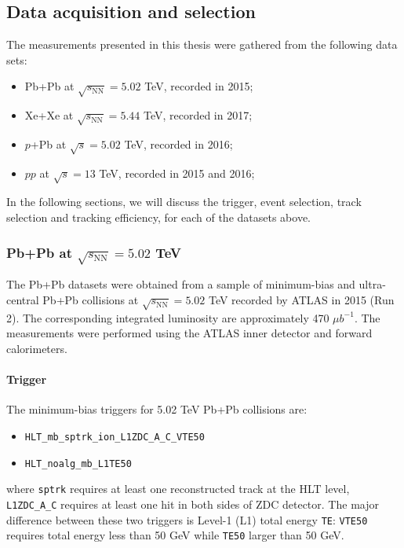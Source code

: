 \subsection{Data acquisition and selection}

The measurements presented in this thesis were gathered from the following data sets:
\begin{itemize}
\item Pb+Pb at $\sqrt{s_\text{NN}}=5.02$ TeV, recorded in 2015;
\item Xe+Xe at $\sqrt{s_\text{NN}}=5.44$ TeV, recorded in 2017;
\item $p$+Pb at $\sqrt{s}=5.02$ TeV, recorded in 2016;
\item $pp$ at $\sqrt{s}=13$ TeV, recorded in 2015 and 2016;
\end{itemize}
In the following sections, we will discuss the trigger, event selection, track selection and tracking efficiency, for each of the datasets above.



\subsubsection{Pb+Pb at $\sqrt{s_\text{NN}}=5.02$ TeV}

The Pb+Pb datasets were obtained from a sample of minimum-bias and ultra-central Pb+Pb collisions at $\sqrt{s_\text{NN}}=5.02$ TeV recorded by ATLAS in 2015 (Run 2). The corresponding integrated luminosity are approximately 470 $\mu b^{-1}$. The measurements were performed using the ATLAS inner detector and forward calorimeters.



\paragraph{Trigger}

The minimum-bias triggers for 5.02 TeV Pb+Pb collisions are:
\begin{itemize}
\item \verb|HLT_mb_sptrk_ion_L1ZDC_A_C_VTE50|
\item \verb|HLT_noalg_mb_L1TE50|
\end{itemize}
where \verb|sptrk| requires at least one reconstructed track at the HLT level, \verb|L1ZDC_A_C| requires at least one hit in both sides of ZDC detector. The major difference between these two triggers is Level-1 (L1) total energy \verb|TE|: \verb|VTE50| requires total energy less than 50 GeV while \verb|TE50| larger than 50 GeV.

